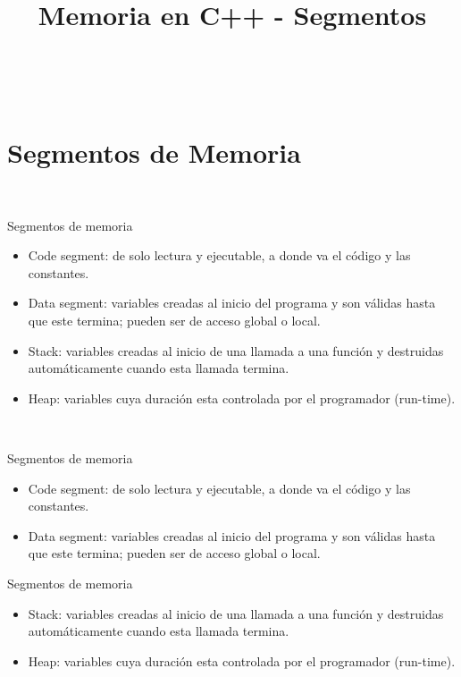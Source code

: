

\title%
{Memoria en C++ - Segmentos}

\subject{Memoria en C++ - Segmentos}




\begin{frame}
   \titlepage
\end{frame}

~%
\section{Segmentos de Memoria}
~%
\begin{frame}[fragile,label=SM]{Segmentos de memoria}
   \begin{itemize}
      \item<1-> Code segment: de solo lectura y ejecutable, a donde va el c\'odigo y las constantes.
      \item<2-> Data segment: variables creadas al inicio del programa y son v\'alidas hasta que este termina; pueden ser de acceso global o local.
      \item<3-> Stack: variables creadas al inicio de una llamada a una funci\'on y destruidas autom\'aticamente cuando esta llamada termina.
      \item<4-> Heap: variables cuya duraci\'on esta controlada por el programador (run-time).
   \end{itemize}
\end{frame}
~%
\begin{frame}[fragile]{Segmentos de memoria}
   \begin{itemize}
      \item<1-> Code segment: de solo lectura y ejecutable, a donde va el c\'odigo y las constantes.
      \item<2-> Data segment: variables creadas al inicio del programa y son v\'alidas hasta que este termina; pueden ser de acceso global o local.
   \end{itemize}
\end{frame}
\begin{frame}[fragile]{Segmentos de memoria}
   \begin{itemize}
      \item<3-> Stack: variables creadas al inicio de una llamada a una funci\'on y destruidas autom\'aticamente cuando esta llamada termina.
      \item<4-> Heap: variables cuya duraci\'on esta controlada por el programador (run-time).
   \end{itemize}
\end{frame}
